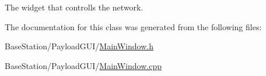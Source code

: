The widget that controlls the network. 



The documentation for this class was generated from the following files\-:\begin{DoxyCompactItemize}
\item 
Base\-Station/\-Payload\-G\-U\-I/\hyperlink{MainWindow_8h}{Main\-Window.\-h}\item 
Base\-Station/\-Payload\-G\-U\-I/\hyperlink{MainWindow_8cpp}{Main\-Window.\-cpp}\end{DoxyCompactItemize}

